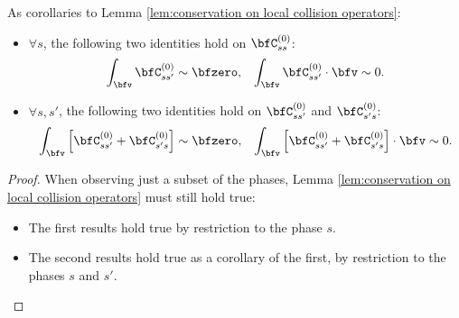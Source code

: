     \begin{corollary}
        As corollaries to Lemma \ref{lem:conservation on local collision operators}:
        \begin{itemize}
            \item  $\forall s$, the following two identities hold on $\bfC_{ss}^{(0)}$:
            \begin{align}
                \int_{\bfv}\bfC_{ss'}^{(0)}           \sim  \bfzero,  &&
                \int_{\bfv}\bfC_{ss'}^{(0)}\cdot\bfv  \sim  0.
            \end{align}
            \item  $\forall s, s'$, the following two identities hold on $\bfC_{ss'}^{(0)}$ and $\bfC_{s's}^{(0)}$:
            \begin{align}
                \int_{\bfv}\left[\bfC_{ss'}^{(0)} + \bfC_{s's}^{(0)}\right]           \sim  \bfzero,  &&
                \int_{\bfv}\left[\bfC_{ss'}^{(0)} + \bfC_{s's}^{(0)}\right]\cdot\bfv  \sim  0.
            \end{align}
        \end{itemize}
    \end{corollary}
    \begin{proof}
        When observing just a subset of the phases, Lemma \ref{lem:conservation on local collision operators} must still hold true:
        \begin{itemize}
            \item  The first results hold true by restriction to the phase $s$.
            \item  The second results hold true as a corollary of the first, by restriction to the phases $s$ and $s'$.
        \end{itemize}
    \end{proof}
